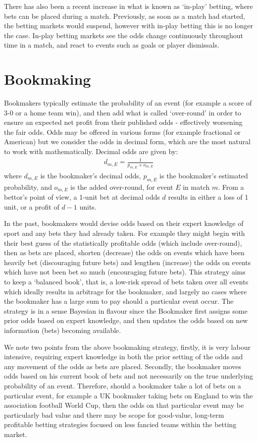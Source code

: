 There has also been a recent increase in what is known as `in-play' betting, where bets can be placed during a match.
Previously, as soon as a match had started, the betting markets would suspend, however with in-play betting this is no
longer the case. In-play betting markets see the odds change continuously throughout time in a match, and react to
events such as goals or player dismissals.

\section{Bookmaking}
\label{sec:Bookmaking}

Bookmakers typically estimate the probability of an event (for example a score of 3-0 or a home team win), and then add
what is called `over-round' in order to ensure an expected net profit from their published odds - effectively worsening the
fair odds. Odds may be offered in various forms (for example fractional or American) but we consider the odds in decimal
form, which are the most natural to work with mathematically. Decimal odds are given by:
\begin{align}
d_{m, E} = \frac{1}{p_{m, E} + o_{m, E}}
\end{align}
where \(d_{m, E}\) is the bookmaker's decimal odds, \(p_{m, E}\) is the bookmaker's estimated probability, and \(o_{m,
E}\) is the added over-round, for event \(E\) in match \(m\). From a bettor's point of view, a 1-unit bet at decimal
odds \(d\) results in either a loss of 1 unit, or a profit of \(d-1\) units.

In the past, bookmakers would devise odds based on their expert knowledge of sport and any bets they had already taken.
For example they might begin with their best guess of the statistically profitable odds (which include over-round), then
as bets are placed, shorten (decrease) the odds on events which have been heavily bet (discouraging future bets) and
lengthen (increase) the odds on events which have not been bet so much (encouraging future bets). This strategy aims to
keep a `balanced book', that is, a low-risk spread of bets taken over all events which ideally results in arbitrage for
the bookmaker, and largely no cases where the bookmaker has a large sum to pay should a particular event occur. The
strategy is in a sense Bayesian in flavour since the Bookmaker first assigns some prior odds based on expert knowledge,
and then updates the odds based on new information (bets) becoming available.

We note two points from the above bookmaking strategy, firstly, it is very labour intensive, requiring expert knowledge
in both the prior setting of the odds and any movement of the odds as bets are placed. Secondly, the bookmaker moves
odds based on his current book of bets and not necessarily on the true underlying probability of an event. Therefore,
should a bookmaker take a lot of bets on a particular event, for example a UK bookmaker taking bets on England to win
the association football World Cup, then the odds on that particular event may be particularly bad value and there may
be scope for good-value, long-term profitable betting strategies focused on less fancied teams within the betting market.

